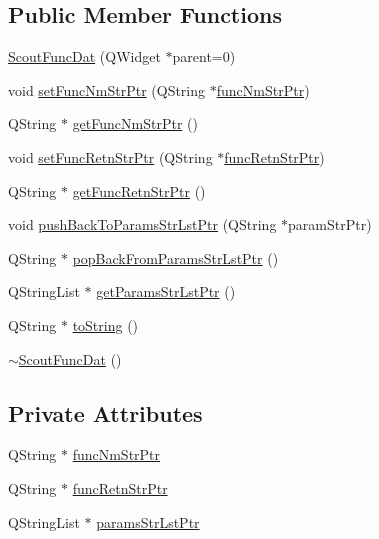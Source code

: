 \subsection*{Public Member Functions}
\begin{DoxyCompactItemize}
\item 
\hyperlink{class_scout_func_dat_a278b009a21b5fc30d7b12ebedc0fde03}{Scout\-Func\-Dat} (Q\-Widget $\ast$parent=0)
\item 
void \hyperlink{class_scout_func_dat_a6cf49f576ecaf36b164dcc8cbc4dc3b1}{set\-Func\-Nm\-Str\-Ptr} (Q\-String $\ast$\hyperlink{class_scout_func_dat_a1b4edcb363b7194c496b1af2be0314f7}{func\-Nm\-Str\-Ptr})
\item 
Q\-String $\ast$ \hyperlink{class_scout_func_dat_a2ce683950cc5f23c08071e57fdd02b37}{get\-Func\-Nm\-Str\-Ptr} ()
\item 
void \hyperlink{class_scout_func_dat_a25e0db66b6928a60cf0ee607639cecc6}{set\-Func\-Retn\-Str\-Ptr} (Q\-String $\ast$\hyperlink{class_scout_func_dat_a3c2f7ad50c5845171ee2a991fa3fa7ff}{func\-Retn\-Str\-Ptr})
\item 
Q\-String $\ast$ \hyperlink{class_scout_func_dat_a540165e8b1aa0b74804ca61e0d4a05e8}{get\-Func\-Retn\-Str\-Ptr} ()
\item 
void \hyperlink{class_scout_func_dat_a4268378e6ccb492700deeb311d267fa4}{push\-Back\-To\-Params\-Str\-Lst\-Ptr} (Q\-String $\ast$param\-Str\-Ptr)
\item 
Q\-String $\ast$ \hyperlink{class_scout_func_dat_ac79446b5cacfed10b73b4c4f5b185efc}{pop\-Back\-From\-Params\-Str\-Lst\-Ptr} ()
\item 
Q\-String\-List $\ast$ \hyperlink{class_scout_func_dat_a85a187b33436c5c6728e5aa5bd4897de}{get\-Params\-Str\-Lst\-Ptr} ()
\item 
Q\-String $\ast$ \hyperlink{class_scout_func_dat_aa44fe20c53033a8930375db0d08c0baa}{to\-String} ()
\item 
\hyperlink{class_scout_func_dat_a58fc30214eee6ee7bbb389989d8c80eb}{$\sim$\-Scout\-Func\-Dat} ()
\end{DoxyCompactItemize}
\subsection*{Private Attributes}
\begin{DoxyCompactItemize}
\item 
Q\-String $\ast$ \hyperlink{class_scout_func_dat_a1b4edcb363b7194c496b1af2be0314f7}{func\-Nm\-Str\-Ptr}
\item 
Q\-String $\ast$ \hyperlink{class_scout_func_dat_a3c2f7ad50c5845171ee2a991fa3fa7ff}{func\-Retn\-Str\-Ptr}
\item 
Q\-String\-List $\ast$ \hyperlink{class_scout_func_dat_a86bca60ebf50298f4c4e3e5d61ab98a5}{params\-Str\-Lst\-Ptr}
\end{DoxyCompactItemize}


